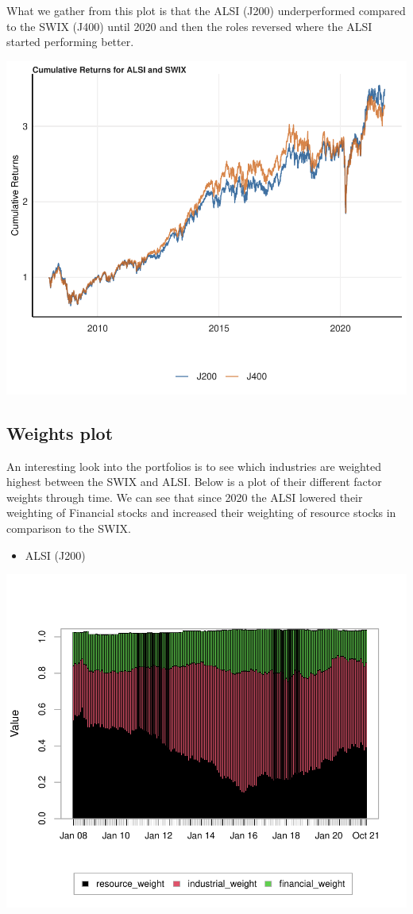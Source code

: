 \documentclass[11pt,preprint, authoryear]{elsarticle}
\numberwithin{equation}{section}
\numberwithin{figure}{section}
\numberwithin{table}{section}
\def\tightlist{} %
\begin{document}
What we gather from this plot is that the ALSI (J200) underperformed
compared to the SWIX (J400) until 2020 and then the roles reversed where
the ALSI started performing better.

\includegraphics{Question3_files/figure-latex/unnamed-chunk-3-1.pdf}

\hypertarget{weights-plot}{%
\subsection{Weights plot}\label{weights-plot}}

An interesting look into the portfolios is to see which industries are
weighted highest between the SWIX and ALSI. Below is a plot of their
different factor weights through time. We can see that since 2020 the
ALSI lowered their weighting of Financial stocks and increased their
weighting of resource stocks in comparison to the SWIX.

\begin{itemize}
\tightlist
\item
  ALSI (J200)
\end{itemize}

\includegraphics{Question3_files/figure-latex/unnamed-chunk-5-1.pdf}
\end{document}
